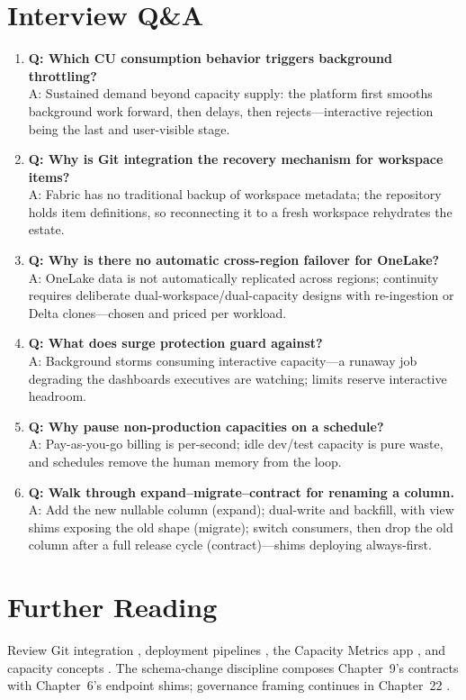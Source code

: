\section{Interview Q\&A}
\begin{enumerate}
    \item \textbf{Q: Which CU consumption behavior triggers background throttling?}\\
    A: Sustained demand beyond capacity supply: the platform first smooths background work forward, then delays, then rejects---interactive rejection being the last and user-visible stage.
    \item \textbf{Q: Why is Git integration the recovery mechanism for workspace items?}\\
    A: Fabric has no traditional backup of workspace metadata; the repository holds item definitions, so reconnecting it to a fresh workspace rehydrates the estate.
    \item \textbf{Q: Why is there no automatic cross-region failover for OneLake?}\\
    A: OneLake data is not automatically replicated across regions; continuity requires deliberate dual-workspace/dual-capacity designs with re-ingestion or Delta clones---chosen and priced per workload.
    \item \textbf{Q: What does surge protection guard against?}\\
    A: Background storms consuming interactive capacity---a runaway job degrading the dashboards executives are watching; limits reserve interactive headroom.
    \item \textbf{Q: Why pause non-production capacities on a schedule?}\\
    A: Pay-as-you-go billing is per-second; idle dev/test capacity is pure waste, and schedules remove the human memory from the loop.
    \item \textbf{Q: Walk through expand--migrate--contract for renaming a column.}\\
    A: Add the new nullable column (expand); dual-write and backfill, with view shims exposing the old shape (migrate); switch consumers, then drop the old column after a full release cycle (contract)---shims deploying always-first.
\end{enumerate}

\section{Further Reading}
Review Git integration \cite{microsoftFabricGitIntegration}, deployment pipelines \cite{microsoftFabricDeploymentPipelines}, the Capacity Metrics app \cite{microsoftFabricMetricsApp}, and capacity concepts \cite{microsoftFabricCapacity}. The schema-change discipline composes Chapter~9's contracts with Chapter~6's endpoint shims; governance framing continues in Chapter~22 \cite{microsoftPurviewFabric}.

